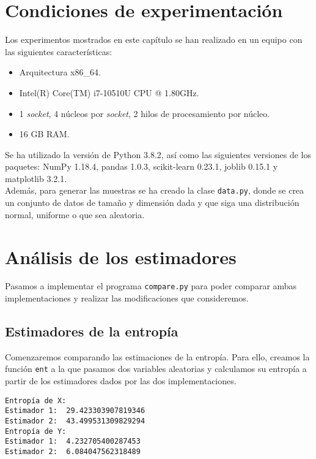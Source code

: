 \documentclass[12pt,a4paper]{report} %
\theoremstyle{definition}
\begin{document}
\section{Condiciones de experimentación}

Los experimentos mostrados en este capítulo se han realizado en un equipo con las siguientes características:

\begin{itemize}
\item Arquitectura x86\_64.
\item Intel(R) Core(TM) i7-10510U CPU @ 1.80GHz.
\item 1 \textit{socket}, 4 núcleos por \textit{socket}, 2 hilos de procesamiento por núcleo.
\item 16 GB RAM.\\
\end{itemize}

Se ha utilizado la versión de Python 3.8.2, así como las siguientes versiones de los paquetes: NumPy 1.18.4, pandas 1.0.3, scikit-learn 0.23.1, joblib 0.15.1 y matplotlib 3.2.1.\\

Además, para generar las muestras se ha creado la clase \texttt{data.py}, donde se crea un conjunto de datos de tamaño y dimensión dada y que siga una distribución normal, uniforme o que sea aleatoria.\\

\section{Análisis de los estimadores}

Pasamos a implementar el programa \texttt{compare.py} para poder comparar ambas implementaciones y realizar las modificaciones que consideremos.\\

\subsection{Estimadores de la entropía}

Comenzaremos comparando las estimaciones de la entropía. Para ello, creamos la función \texttt{ent} a la que pasamos dos variables aleatorias y calculamos su entropía a partir de los estimadores dados por las dos implementaciones.

\begin{lstlisting}
Entropía de X:
Estimador 1:  29.423303907819346
Estimador 2:  43.499531309829294
Entropía de Y:
Estimador 1:  4.232705400287453
Estimador 2:  6.084047562318489

\end{lstlisting}
\end{document}
